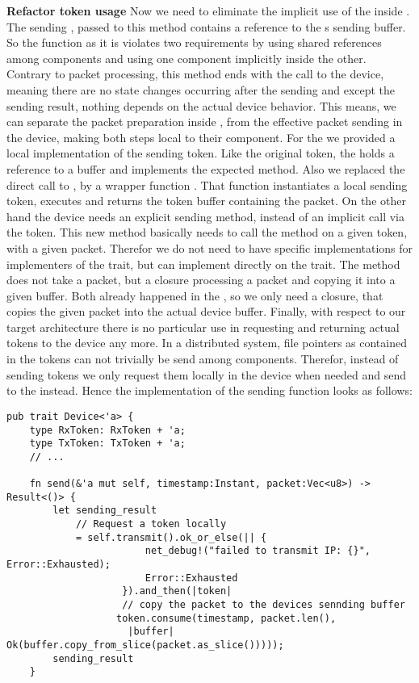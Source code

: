 \textbf{Refactor token usage}
Now we need to eliminate the implicit use of the \dev{} inside . The sending , passed to this method contains a reference to the \dev{}s sending buffer. So the function as it is violates two requirements by using shared references among components and using one component implicitly inside the other.
Contrary to packet processing, this method ends with the call to the device, meaning there are no state changes occurring after the sending and except the sending result, nothing depends on the actual device behavior. This means, we can separate the packet preparation inside , from the effective packet sending in the device, making both steps local to their component. For the \stack{} we provided a local implementation of the sending token. Like the original token, the  holds a reference to a buffer and implements the expected  method. Also we replaced the direct call to , by a wrapper function . That function instantiates a local sending token, executes  and returns the token buffer
containing the packet. On the other hand the device needs an explicit sending method, instead of an implicit call via the token. This new  method basically needs to call the  method on a given token, with a given packet. Therefor we do not need to have specific implementations for implementers of the  trait, but can implement  directly on the trait. The method  does not take a packet, but a closure processing a packet and copying it into a given buffer. Both already happened in the \stack, so we only need a closure, that copies the given packet into the actual device buffer. Finally, with respect to our target architecture there is no particular use in requesting and returning actual tokens to the device any more. In a distributed system, file pointers as contained in the tokens can not trivially be send among components. Therefor, instead of sending tokens we only request them locally in the device when needed and send  to the \stack{} instead. Hence the implementation of the sending function looks as follows:

\begin{verbatim}
pub trait Device<'a> {
    type RxToken: RxToken + 'a;
    type TxToken: TxToken + 'a;
    // ... 
    
    fn send(&'a mut self, timestamp:Instant, packet:Vec<u8>) -> Result<()> {
        let sending_result
            // Request a token locally
            = self.transmit().ok_or_else(|| {
                        net_debug!("failed to transmit IP: {}", Error::Exhausted);
                        Error::Exhausted
                    }).and_then(|token|
                    // copy the packet to the devices sennding buffer
                   token.consume(timestamp, packet.len(),
                     |buffer| Ok(buffer.copy_from_slice(packet.as_slice()))));
        sending_result
    }                 
\end{verbatim}

